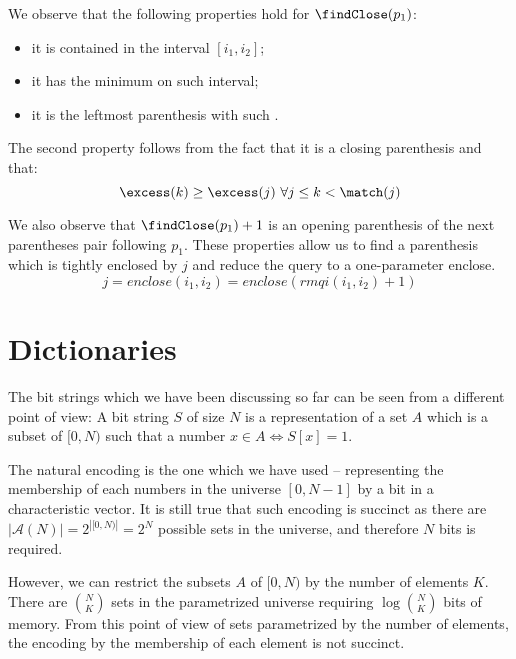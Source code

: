 We observe that the following properties hold for $\findClose(p_1)$:
\begin{itemize}
	\item it is contained in the interval $[i_1, i_2]$;
	\item it has the minimum \excess{} on such interval;
	\item it is the leftmost parenthesis with such \excess{}.
\end{itemize}
The second property follows from the fact that it is a closing parenthesis and that:
$$ \excess(k) \ge \excess(j) \ \forall j \le k < \match(j) $$

We also observe that $\findClose(p_1) + 1$ is an opening parenthesis of the next parentheses pair following $p_1$.
These properties allow us to find a parenthesis which is tightly enclosed by $j$ and reduce the query to a one-parameter enclose.
$$ j = enclose(i_1, i_2) = enclose(rmqi(i_1, i_2) + 1) $$

\section{Dictionaries}

The bit strings which we have been discussing so far can be seen from a different point of view:
A bit string $S$ of size $N$ is a representation of a set $A$ which is a subset of $[0, N)$ such that a number $x \in A \iff S[x] = 1$.

The natural encoding is the one which we have used -- representing the membership of each numbers in the universe $[0, N - 1]$ by a bit in a characteristic vector.
It is still true that such encoding is succinct as there are $| \mathcal{A}(N) | = 2^{|[0, N)|} = 2^N$ possible sets in the universe, and therefore $N$ bits is required.

However, we can restrict the subsets $A$ of $[0, N)$ by the number of elements $K$.
There are ${N \choose K}$ sets in the parametrized universe requiring $\log {N \choose K}$ bits of memory.
From this point of view of sets parametrized by the number of elements, the encoding by the membership of each element is not succinct.

\bigbreak

